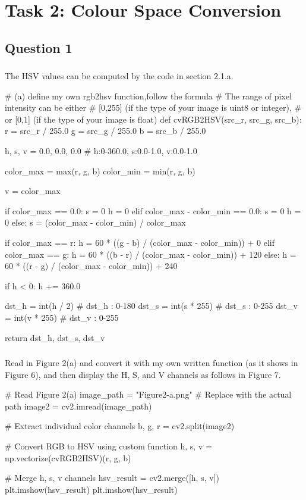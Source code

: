 \documentclass[12pt]{article}
\begin{document}
\section{Task 2: Colour Space Conversion}

\subsection{Question 1}

\subsubsection{}
\quad The HSV values can be computed by the code in section 2.1.a.
\begin{python}
# (a) define my own rgb2hsv function,follow the formula
# The range of pixel intensity can be either 
# [0,255] (if the type of your image is uint8 or integer), 
# or [0,1] (if the type of your image is float)
def cvRGB2HSV(src_r, src_g, src_b):
    r = src_r / 255.0
    g = src_g / 255.0
    b = src_b / 255.0

    h, s, v = 0.0, 0.0, 0.0  # h:0-360.0, s:0.0-1.0, v:0.0-1.0

    color_max = max(r, g, b)
    color_min = min(r, g, b)

    v = color_max

    if color_max == 0.0:
        s = 0
        h = 0
    elif color_max - color_min == 0.0:
        s = 0
        h = 0
    else:
        s = (color_max - color_min) / color_max

        if color_max == r:
            h = 60 * ((g - b) / (color_max - color_min)) + 0
        elif color_max == g:
            h = 60 * ((b - r) / (color_max - color_min)) + 120
        else:
            h = 60 * ((r - g) / (color_max - color_min)) + 240

    if h < 0:
        h += 360.0

    dst_h = int(h / 2)   # dst_h : 0-180
    dst_s = int(s * 255)  # dst_s : 0-255
    dst_v = int(v * 255)  # dst_v : 0-255

    return dst_h, dst_s, dst_v
\end{python}
\subsubsection{}
\quad Read in Figure 2(a) and convert it with my own written function (as it shows in Figure 6), and then display the H, S, and V
channels as follows in Figure 7.
\begin{python}
# Read Figure 2(a)
image_path = "Figure2-a.png"  # Replace with the actual path
image2 = cv2.imread(image_path)

# Extract individual color channels
b, g, r = cv2.split(image2)

# Convert RGB to HSV using custom function
h, s, v = np.vectorize(cvRGB2HSV)(r, g, b)

# Merge h, s, v channels
hsv_result = cv2.merge([h, s, v])
plt.imshow(hsv_result)
plt.imshow(hsv_result)
\end{python}
\end{document}
